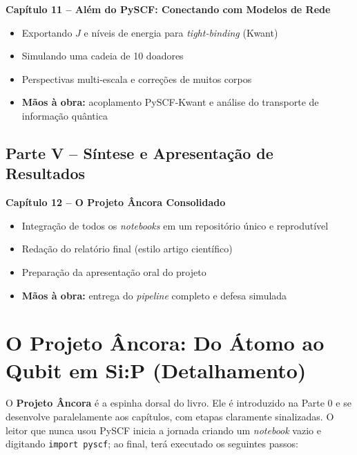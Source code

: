 \documentclass[12pt,a4paper]{article}
\begin{document}
	\textbf{Capítulo 11 -- Além do PySCF: Conectando com Modelos de Rede}
	\begin{itemize}
		\item Exportando $J$ e níveis de energia para \emph{tight-binding} (Kwant)
		\item Simulando uma cadeia de 10 doadores
		\item Perspectivas multi-escala e correções de muitos corpos
		\item \textbf{Mãos à obra:} acoplamento PySCF-Kwant e análise do transporte de informação quântica
	\end{itemize}
	
	\subsection*{Parte V -- Síntese e Apresentação de Resultados}
	
	\textbf{Capítulo 12 -- O Projeto Âncora Consolidado}
	\begin{itemize}
		\item Integração de todos os \emph{notebooks} em um repositório único e reprodutível
		\item Redação do relatório final (estilo artigo científico)
		\item Preparação da apresentação oral do projeto
		\item \textbf{Mãos à obra:} entrega do \emph{pipeline} completo e defesa simulada
	\end{itemize}
	
	\section{O Projeto Âncora: Do Átomo ao Qubit em Si:P (Detalhamento)}
	
	O \textbf{Projeto Âncora} é a espinha dorsal do livro. Ele é introduzido na Parte 0 e se desenvolve paralelamente aos capítulos, com etapas claramente sinalizadas. O leitor que nunca usou PySCF inicia a jornada criando um \emph{notebook} vazio e digitando \texttt{import pyscf}; ao final, terá executado os seguintes passos:
	
\end{document}
